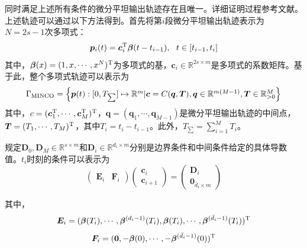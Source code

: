 同时满足上述所有条件的微分平坦输出轨迹存在且唯一。详细证明过程参考文献\cite{wang2022geometrically}。上述轨迹可以通过以下方法得到。首先将第$i$段微分平坦输出轨迹表示为$N=2s-1$次多项式：
\begin{equation}\label{p_i}
    \boldsymbol{p}_i(t) = \boldsymbol{c}_i^{\rm{T}}\boldsymbol{\beta}(t-t_{i-1}),\,\,\,\, t \in \left[ t_{i-1}, t_i\right]
\end{equation}
其中，$\boldsymbol{\beta}(x) = (1,x,\cdots,x^N){\rm{^T}}$为多项式的基，$\boldsymbol{c}_i \in \mathbb{R}^{2s\times m}$是多项式的系数矩阵。基于此，整个多项式轨迹可以表示为
\begin{equation}
    \begin{array}{c}
        \Gamma_{\rm{MINCO}} = \left\{
            \boldsymbol{p}(t):[0,T_{\sum}] \mapsto \mathbb{R}^m | \boldsymbol{c} = C(\boldsymbol{q}, \boldsymbol{T}),
            \boldsymbol{q} \in \mathbb{R}^{m(M-1)}, \boldsymbol{T} \in \mathbb{R}^M_{>0} 
            \right\}
    \end{array}
\end{equation}
其中，$c = (\boldsymbol{c}_1^{\rm{T}}, \cdots, \boldsymbol{c}_M^{\rm{T}})^{\rm{T}}$，$\boldsymbol{q} = (\boldsymbol{q}_1, \cdots, \boldsymbol{q}_{M-1})$是微分平坦输出轨迹的中间点，$\boldsymbol{T} = (T_1,\cdots,T_M)^{\rm{T}}$，其中$T_i = t_i - t_{i-1}$。此外，$T_{\sum} = \sum\nolimits_{i=1}^{M} {T_i}$。

规定$\boldsymbol{D}_0, \boldsymbol{D}_M \in \mathbb{R}^{s\times m}$和$\boldsymbol{D}_i \in \mathbb{R}^{d_i\times m}$分别是边界条件和中间条件给定的具体导数值。$t_i$时刻的条件可以表示为
\begin{equation}
    \left( {\begin{array}{*{20}{c}}
        {\boldsymbol{E}_i}&{\boldsymbol{F}_i}
    \end{array}} \right)
    \left( {\begin{array}{*{20}{c}}
        {\boldsymbol{c}_i}\\
        {\boldsymbol{c}_{i+1}}
    \end{array}} \right)
    = \left( {\begin{array}{*{20}{c}}
        {\boldsymbol{D}_i}\\
        {\boldsymbol{0}_{\bar{d}_i\times m}}
    \end{array}} \right)
\end{equation}

其中，
\begin{equation}
    \boldsymbol{E}_i = (\boldsymbol{\beta}(T_i), \cdots, \boldsymbol{\beta}^{(d_i-1)}(T_i), \boldsymbol{\beta}(T_i), \cdots, \boldsymbol{\beta}^{(\bar{d}_i-1)}(T_i)){\rm{^T}}
\end{equation}
\begin{equation}
    \boldsymbol{F}_i = (\boldsymbol{0}, -\boldsymbol{\beta}(0), \cdots, -\boldsymbol{\beta}^{(\bar{d_i}-1)}(0)){\rm{^T}}
\end{equation}

